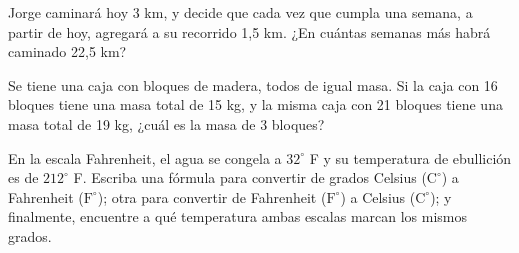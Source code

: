 \documentclass[sin nombre]{srs2}
\begin{document}
\begin{preguntas}[raster row skip=10pt]
\pregunta Jorge caminará hoy 3 km, y decide que cada vez que cumpla
una semana, a partir de hoy, agregará a
su recorrido 1,5 km. ¿En cuántas semanas más habrá caminado 22,5 km?
\begin{malla}[5]
\end{malla}
\pregunta Se tiene una caja con bloques de madera, todos de igual masa. Si
la caja con 16 bloques tiene una masa total de 15 kg, y la misma caja con
21 bloques tiene una masa total de 19 kg, ¿cuál es la masa de 3 bloques?
\begin{malla}[5]
\end{malla}
\pregunta En la escala Fahrenheit, el agua se congela a $32^{\circ}$ F y su
temperatura de ebullición es de $212^{\circ}$ F. Escriba una fórmula para
convertir de grados Celsius ($\text{C}^\circ$) a Fahrenheit ($\text{F}^\circ$);
otra para convertir de Fahrenheit ($\text{F}^\circ$) a Celsius ($\text{C}^\circ$);
y finalmente, encuentre a qué temperatura ambas escalas marcan los mismos grados.
\begin{malla}[9]
\end{malla}
\end{preguntas}
\end{document}

